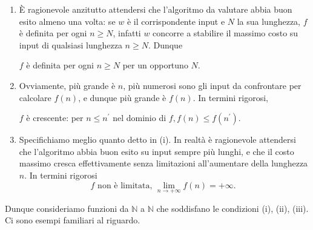\begin{enumerate}[label=(\roman*)]
    \item È ragionevole
          anzitutto attendersi che l'algoritmo da valutare abbia buon esito almeno una
          volta: se $w$ è il corrispondente input e $N$ la sua lunghezza, $f$ è definita
          per ogni $n \geq N$, infatti $w$ concorre a stabilire il massimo costo su input
          di qualsiasi lunghezza $n \geq N$. Dunque

          \begin{center}
              $f$ è definita per ogni $n \geq N$ per un opportuno $N$.
          \end{center}

    \item Ovviamente, più grande è $n$, più numerosi sono gli input
          da confrontare per calcolare $f(n)$, e dunque più grande è $f(n)$. In termini
          rigorosi,

          \begin{center}
              $f$ è crescente: per $n \leq n^{\prime}$ nel dominio di $f, f(n) \leq
                  f\left(n^{\prime}\right)$.
          \end{center}

    \item Specifichiamo meglio quanto detto in (i). In
          realtà è ragionevole attendersi che l'algoritmo abbia buon esito su input sempre
          più lunghi, e che il costo massimo cresca effettivamente senza limitazioni
          all'aumentare della lunghezza $n$. In termini rigorosi
          $$
              f \text { non è limitata, } \lim _{n \rightarrow+\infty} f(n)=+\infty \text {. }
          $$
\end{enumerate}

Dunque consideriamo funzioni da $\mathbb{N}$ a $\mathbb{N}$ che soddisfano le
condizioni (i), (ii), (iii). Ci sono esempi familiari al riguardo.